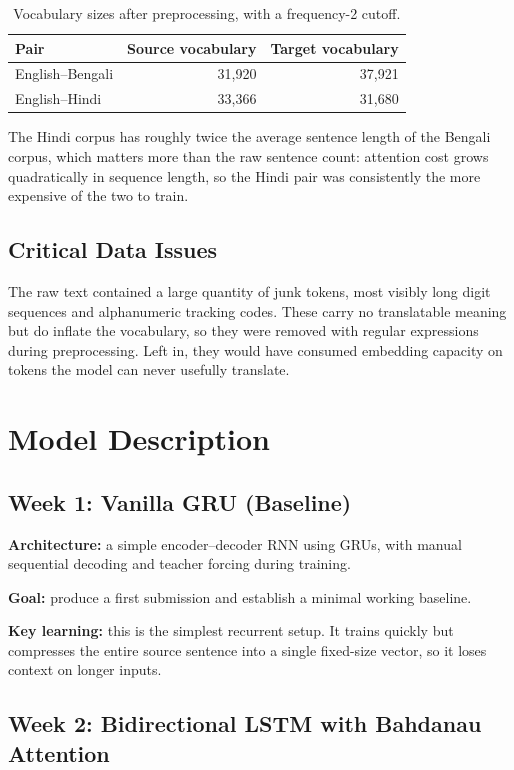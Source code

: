 \documentclass[11pt, oneside]{article}
\begin{document}
\begin{table}[h!]
\centering
\small
\begin{tabular}{@{}lrr@{}}
\toprule
Pair & Source vocabulary & Target vocabulary \\
\midrule
English--Bengali & 31{,}920 & 37{,}921 \\
English--Hindi & 33{,}366 & 31{,}680 \\
\bottomrule
\end{tabular}
\caption{Vocabulary sizes after preprocessing, with a frequency-2 cutoff.}
\end{table}

The Hindi corpus has roughly twice the average sentence length of the Bengali corpus, which
matters more than the raw sentence count: attention cost grows quadratically in sequence
length, so the Hindi pair was consistently the more expensive of the two to train.

\subsection{Critical Data Issues}

The raw text contained a large quantity of junk tokens, most visibly long digit sequences and
alphanumeric tracking codes. These carry no translatable meaning but do inflate the
vocabulary, so they were removed with regular expressions during preprocessing. Left in, they
would have consumed embedding capacity on tokens the model can never usefully translate.

\section{Model Description}

\subsection{Week 1: Vanilla GRU (Baseline)}

\textbf{Architecture:} a simple encoder--decoder RNN using GRUs, with manual sequential
decoding and teacher forcing during training.

\textbf{Goal:} produce a first submission and establish a minimal working baseline.

\textbf{Key learning:} this is the simplest recurrent setup. It trains quickly but compresses
the entire source sentence into a single fixed-size vector, so it loses context on longer
inputs.

\subsection{Week 2: Bidirectional LSTM with Bahdanau Attention}
\end{document}
